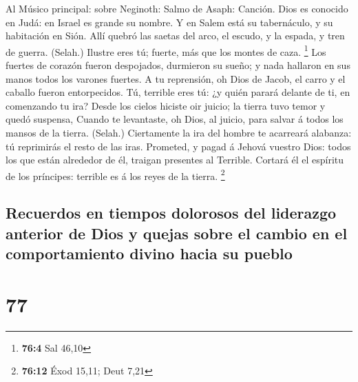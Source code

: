  Al Músico principal: sobre Neginoth: Salmo de Asaph:
Canción. Dios es conocido en Judá: en Israel es grande su nombre.
 Y en Salem está su tabernáculo, y su habitación en Sión.
 Allí quebró las saetas del arco, el escudo, y la espada, y
tren de guerra. (Selah.)  Ilustre eres tú; fuerte, más que
los montes de caza. \footnote{\textbf{76:4} Sal 46,10}  Los
fuertes de corazón fueron despojados, durmieron su sueño; y nada
hallaron en sus manos todos los varones fuertes.  A tu
reprensión, oh Dios de Jacob, el carro y el caballo fueron entorpecidos.
 Tú, terrible eres tú: ¿y quién parará delante de ti, en
comenzando tu ira?  Desde los cielos hiciste oir juicio; la
tierra tuvo temor y quedó suspensa,  Cuando te levantaste,
oh Dios, al juicio, para salvar á todos los mansos de la tierra.
(Selah.)  Ciertamente la ira del hombre te acarreará
alabanza: tú reprimirás el resto de las iras.  Prometed, y
pagad á Jehová vuestro Dios: todos los que están alrededor de él,
traigan presentes al Terrible.  Cortará él el espíritu de
los príncipes: terrible es á los reyes de la tierra. \footnote{\textbf{76:12}
  Éxod 15,11; Deut 7,21}

\hypertarget{recuerdos-en-tiempos-dolorosos-del-liderazgo-anterior-de-dios-y-quejas-sobre-el-cambio-en-el-comportamiento-divino-hacia-su-pueblo}{%
\subsection{Recuerdos en tiempos dolorosos del liderazgo anterior de
Dios y quejas sobre el cambio en el comportamiento divino hacia su
pueblo}\label{recuerdos-en-tiempos-dolorosos-del-liderazgo-anterior-de-dios-y-quejas-sobre-el-cambio-en-el-comportamiento-divino-hacia-su-pueblo}}

\hypertarget{section-76}{%
\section{77}\label{section-76}}


